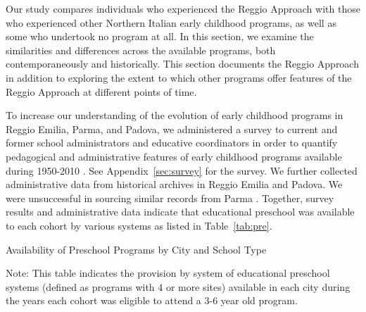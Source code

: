 Our study compares individuals who experienced the Reggio Approach with those who experienced other Northern Italian early childhood programs, as well as some who undertook no program at all. In this section, we examine the similarities and differences across the available programs, both contemporaneously and historically. This section documents the Reggio Approach in addition to exploring the extent to which other programs offer features of the Reggio Approach at different points of time.

To increase our understanding of the evolution of early childhood programs in Reggio Emilia, Parma, and Padova, we administered a survey to current and former school administrators and educative coordinators in order to quantify pedagogical and administrative features of early childhood programs available during 1950-2010 \citep{CEHD_2016_Historical-Analysis}. See Appendix~\ref{sec:survey} for the survey. We further collected administrative data from historical archives in Reggio Emilia and Padova. We were unsuccessful in sourcing similar records from Parma \citep{Padova-Admin-Data_1964-2011,Reggio-Admin-data_1966-2006,Reggio-Annual-Journals_1994-2011}. Together, survey results and administrative data indicate that educational preschool was available to each cohort by various systems as listed in Table~\ref{tab:pre}. 

\begin{table}[H]
\centering
\caption{Availability of Preschool Programs by City and School Type}\label{tab:pre}
\begin{adjustbox}{width=\textwidth}
\begin{threeparttable}
	
\begin{tablenotes}
Note: This table indicates the provision by system of educational preschool systems (defined as programs with 4 or more sites) available in each city during the years each cohort was eligible to attend a 3-6 year old program. 
\end{tablenotes}
\end{threeparttable}
\end{adjustbox}
\end{table}

